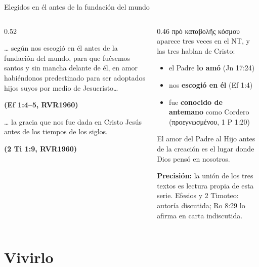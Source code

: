 \documentclass[hyperref={bookmarks=false},aspectratio=169]{beamer}
\newcommand{\grc}[1]{\foreignlanguage{ancientgreek}{#1}}
\newcommand{\fuente}[1]{\par\hfill{\upshape\bfseries\footnotesize\textcolor{azul}{#1}}}
\newcommand{\precision}[1]{{\footnotesize\color{gris}\textbf{Precisión:} #1}}
\begin{document}
\begin{frame}{Elegidos en él antes de la fundación del mundo}
\begin{columns}[t,onlytextwidth]
\begin{column}{0.52\textwidth}
\begin{cita}\ldots{} según nos escogió en él antes de la fundación del mundo, para que fuésemos santos y sin mancha delante de él, en amor habiéndonos predestinado para ser adoptados hijos suyos por medio de Jesucristo\ldots\fuente{(Ef 1:4--5, RVR1960)}\end{cita}
\begin{cita}\ldots{} la gracia que nos fue dada en Cristo Jesús antes de los tiempos de los siglos.\fuente{(2 Ti 1:9, RVR1960)}\end{cita}
\end{column}
\begin{column}{0.46\textwidth}\scriptsize
\grc{πρὸ καταβολῆς κόσμου} aparece tres veces en el NT, y las tres hablan de Cristo:
\begin{itemize}
\item el Padre \textbf{lo amó} (Jn 17:24)
\item nos \textbf{escogió en él} (Ef 1:4)
\item fue \textbf{conocido de antemano} como Cordero (\grc{προεγνωσμένου}, 1 P 1:20)
\end{itemize}
\small El amor del Padre al Hijo antes de la creación es el lugar donde Dios pensó en nosotros.\par\smallskip
\precision{la unión de los tres textos es lectura propia de esta serie. Efesios y 2 Timoteo: autoría discutida; Ro 8:29 lo afirma en carta indiscutida.}
\end{column}
\end{columns}
\end{frame}

\section{Vivirlo}
\end{document}

